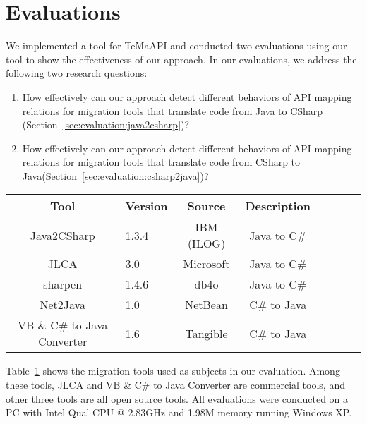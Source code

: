 \section{Evaluations}
\label{sec:evaluation}

We implemented a tool for TeMaAPI and
conducted two evaluations using our tool to show the effectiveness
of our approach. In our evaluations, we address the following
two research questions:

\begin{enumerate}
\item How effectively can our approach detect different behaviors of API mapping relations for migration tools that translate code from Java to CSharp (Section~\ref{sec:evaluation:java2csharp})? \vspace*{-1.8ex}
\item How effectively can our approach detect different behaviors of API mapping relations for migration tools that translate code from CSharp to Java(Section~\ref{sec:evaluation:csharp2java})? %
\end{enumerate}%

\begin{table}[t]
\centering
\begin{SmallOut}
\begin {tabular} {|c|l|c|c|c|c|c|c|}
 \hline
\textbf{Tool}& \textbf{Version}& \textbf{Source} &\textbf{Description}\\
\hline
Java2CSharp  &  1.3.4 & IBM (ILOG) & Java to C\# \\
\hline
JLCA         &  3.0   & Microsoft  & Java to C\# \\
\hline
sharpen      &  1.4.6 & db4o       & Java to C\# \\
\hline
Net2Java     &  1.0   & NetBean    &  C\# to Java\\
\hline
VB \& C\# to Java Converter    &  1.6   & Tangible   &  C\# to Java\\
\hline
\end{tabular}\vspace*{-2ex}
 \label{table:subjects}
\end{SmallOut}\vspace*{-2ex}
\end{table}

Table~\ref{table:subjects} shows the migration tools used as subjects in our evaluation. Among these tools, JLCA and VB \& C\# to Java Converter are commercial tools, and other three tools are all open source tools. All evaluations were conducted on a PC with Intel Qual CPU @
2.83GHz and 1.98M memory running Windows XP.

